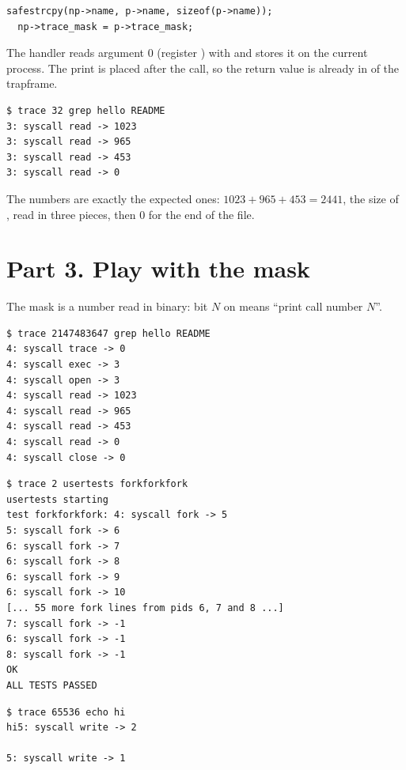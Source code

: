 \documentclass[11pt,a4paper]{article}
\begin{document}
\begin{lstlisting}[style=ccode,firstnumber=290,caption={kernel/proc.c: children inherit the mask in fork()}]
  safestrcpy(np->name, p->name, sizeof(p->name));
  np->trace_mask = p->trace_mask;
\end{lstlisting}

The handler reads argument 0 (register ) with  and stores it on the
current process. The print is placed after the call, so the return value is already in
 of the trapframe.

\begin{lstlisting}[caption={Check 2: trace works}]
$ trace 32 grep hello README
3: syscall read -> 1023
3: syscall read -> 965
3: syscall read -> 453
3: syscall read -> 0
\end{lstlisting}

The numbers are exactly the expected ones: \(1023 + 965 + 453 = 2441\), the size of
, read in three pieces, then 0 for the end of the file.

\section{Part 3. Play with the mask}

The mask is a number read in binary: bit \(N\) on means ``print call number \(N\)''.

\begin{lstlisting}[caption={All the calls (all bits on)}]
$ trace 2147483647 grep hello README
4: syscall trace -> 0
4: syscall exec -> 3
4: syscall open -> 3
4: syscall read -> 1023
4: syscall read -> 965
4: syscall read -> 453
4: syscall read -> 0
4: syscall close -> 0
\end{lstlisting}

\begin{lstlisting}[caption={Only fork (mask 2), on a test that fills the process table}]
$ trace 2 usertests forkforkfork
usertests starting
test forkforkfork: 4: syscall fork -> 5
5: syscall fork -> 6
6: syscall fork -> 7
6: syscall fork -> 8
6: syscall fork -> 9
6: syscall fork -> 10
[... 55 more fork lines from pids 6, 7 and 8 ...]
7: syscall fork -> -1
6: syscall fork -> -1
8: syscall fork -> -1
OK
ALL TESTS PASSED
\end{lstlisting}

\begin{lstlisting}[caption={Only write (mask 65536)}]
$ trace 65536 echo hi
hi5: syscall write -> 2

5: syscall write -> 1
\end{lstlisting}
\end{document}
